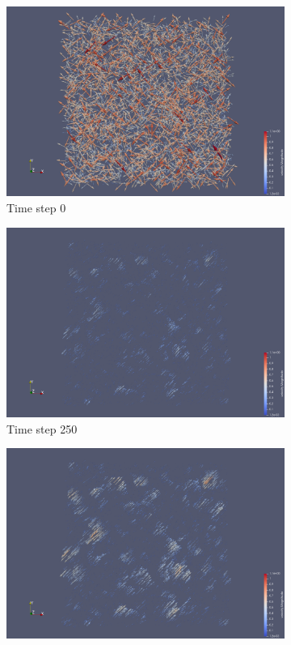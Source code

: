 \documentclass[a4paper,12pt]{article}
\begin{document}
\begin{figure}
\centering
\begin{subfigure}{0.4\textwidth}
    \includegraphics[width=\textwidth]{../images/vtk/bonus/velocity/step_0.png}
    \caption{Time step 0}
\end{subfigure}
\hfill
\begin{subfigure}{0.4\textwidth}
    \includegraphics[width=\textwidth]{../images/vtk/bonus/velocity/step_25.png}
    \caption{Time step 250}
\end{subfigure}
\hfill
\begin{subfigure}{0.4\textwidth}
    \includegraphics[width=\textwidth]{../images/vtk/bonus/velocity/step_50.png}

\end{subfigure}
\end{figure}
\end{document}
